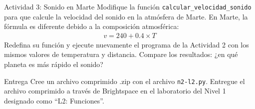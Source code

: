 \documentclass{ip-lab}
\begin{document}
\begin{sectionbox}{Actividad 3: Sonido en Marte}
Modifique la función \texttt{calcular\_velocidad\_sonido} para que calcule la velocidad del sonido en la atmósfera de Marte. En Marte, la fórmula es diferente debido a la composición atmosférica:
\begin{gather*}
    v = 240 + 0.4 \times T
\end{gather*}
Redefina su función y ejecute nuevamente el programa de la Actividad 2 con los mismos valores de temperatura y distancia. Compare los resultados: ¿en qué planeta es más rápido el sonido?
\end{sectionbox}

\begin{sectionbox}{Entrega}
Cree un archivo comprimido .zip con el archivo \texttt{n2-l2.py}. Entregue el archivo comprimido a través de Brightspace en el laboratorio del Nivel 1 designado como ``L2: Funciones''.
\end{sectionbox}
\end{document}
